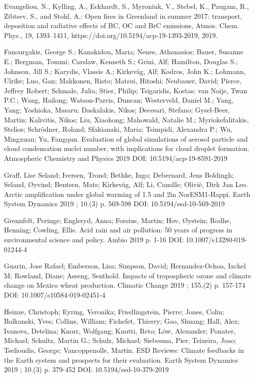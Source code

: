 \begin{list}{}{\setlength{\leftmargin}{15pt}\setlength{\itemindent}{-\leftmargin}}
\item[]
Evangeliou, N., Kylling, A., Eckhardt, S., Myroniuk, V., Stebel, K., Paugam, R., Zibtsev, S., and Stohl, A.: 
Open fires in Greenland in summer 2017: transport, deposition and radiative effects of BC, OC and BrC emissions, 
Atmos. Chem. Phys., 19, 1393–1411, https://doi.org/10.5194/acp-19-1393-2019, 2019.

\item[]
Fanourgakis, George S.; Kanakidou, Maria; Nenes, Athanasios; Bauer, Susanne E.; Bergman, Tommi; Carslaw, Kenneth S.; Grini, Alf; Hamilton, Douglas S.; Johnson, Jill S.; Karydis, Vlassis A.; Kirkevåg, Alf; Kodros, John K.; Lohmann, Ulrike; Luo, Gan; Makkonen, Risto; Matsui, Hitoshi; Neubauer, David; Pierce, Jeffrey Robert; Schmale, Julia; Stier, Philip; Tsigaridis, Kostas; van Noije, Twan P.C.; Wang, Hailong; Watson-Parris, Duncan; Westerveld, Daniel M.; Yang, Yang; Yoshioka, Masaru; Daskalakis, Nikos; Decesari, Stefano; Gysel-Beer, Martin; Kalivitis, Nikos; Liu, Xiaohong; Mahowald, Natalie M.; Myriokefalitakis, Stelios; Schrödner, Roland; Sfakianaki, Maria; Tsimpidi, Alexandra P.; Wu, Mingxuan; Yu, Fangqun. Evaluation of global simulations of aerosol particle and cloud condensation nuclei number, with implications for cloud droplet formation.
Atmospheric Chemistry and Physics 2019
DOI: 10.5194/acp-19-8591-2019

\item[]
Graff, Lise Seland; Iversen, Trond; Bethke, Ingo; Debernard, Jens Boldingh; Seland, Øyvind; Bentsen, Mats; Kirkevåg, Alf; Li, Camille; Oliviè, Dirk Jan Leo.
Arctic amplification under global warming of 1.5 and 2\degC in NorESM1-Happi.
Earth System Dynamics 2019 ; 10.(3) p. 569-598
DOI: 10.5194/esd-10-569-2019

\item[]
Grennfelt, Peringe; Engleryd, Anna; Forsius, Martin; Hov, Øystein; Rodhe, Henning; Cowling, Ellis.
Acid rain and air pollution: 50 years of progress in environmental science and policy.
Ambio 2019 p. 1-16
DOI: 10.1007/s13280-019-01244-4

\item[]
Guarin, Jose Rafael; Emberson, Lisa; Simpson, David; Hernandez-Ochoa, Ixchel M; Rowland, Diane; Asseng, Senthold.
Impacts of tropospheric ozone and climate change on Mexico wheat production.
Climatic Change 2019 ; 155.(2) p. 157-174
DOI: 10.1007/s10584-019-02451-4

\item[]
Heinze, Christoph; Eyring, Veronika; Friedlingstein, Pierre; Jones, Colin; Balkanski, Yves; Collins, William; Fichefet, Thierry; Gao, Shuang; Hall, Alex; Ivanova, Detelina; Knorr, Wolfgang; Knutti, Reto; Löw, Alexander; Ponater, Michael; Schultz, Martin G.; Schulz, Michael; Siebesma, Pier; Teixeira, Joao; Tselioudis, George; Vancoppenolle, Martin.
ESD Reviews: Climate feedbacks in the Earth system and prospects for their evaluation.
Earth System Dynamics 2019 ; 10.(3) p. 379-452
DOI: 10.5194/esd-10-379-2019


\end{list}
